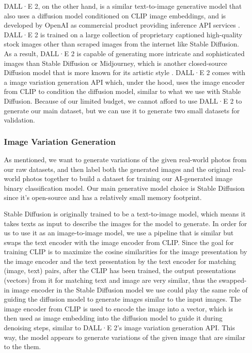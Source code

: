 \documentclass[11pt]{article}
\begin{document}
DALL·E 2, on the other hand, is a similar text-to-image generative model that also uses a diffusion model conditioned on CLIP image embeddings, and is developed by OpenAI as commercial product providing inference API services \cite{ramesh2022hierarchical}. DALL·E 2 is trained on a large collection of proprietary captioned high-quality stock images other than scraped images from the internet like Stable Diffusion. As a result, DALL·E 2 is capable of generating more intricate and sophisticated images than Stable Diffusion or Midjourney, which is another closed-source Diffusion model that is more known for its artistic style \cite{oppenlaender2022creativity}. DALL·E 2 comes with a image variation generation API which, under the hood, uses the image encoder from CLIP to condition the diffusion model, similar to what we use with Stable Diffusion. Because of our limited budget, we cannot afford to use DALL·E 2 to generate our main dataset, but we can use it to generate two small datasets for validation.

\subsubsection{Image Variation Generation}
\label{sec:datasets_image_variation_generation}

As mentioned, we want to generate variations of the given real-world photos from our raw datasets, and then label both the generated images and the original real-world photos together to build a dataset for training our AI-generated image binary classification model. Our main generative model choice is Stable Diffusion since it's open-source and has a relatively small memory footprint.

Stable Diffusion is originally trained to be a text-to-image model, which means it takes texts as input to describe the images for the model to generate. In order for us to use it as an image-to-image model, we use a pipeline that is similar but swaps the text encoder with the image encoder from CLIP. Since the goal for training CLIP is to maximize the cosine similarities for the image presentation by the image encoder and the text presentation by the text encoder for matching (image, text) pairs, after the CLIP has been trained, the output presentations (vectors) from it for matching text and image are very similar, thus the swapped-in image encoder in the Stable Diffusion model we use could play the same role of guiding the diffusion model to generate images similar to the input images. The image encoder from CLIP is used to encode the image into a vector, which is then used as image embedding into the diffusion model to guide it during denoising steps, similar to DALL·E 2's image variation generation API. This way, the model appears to generate variations of the given image that are similar to the them.
\end{document}
